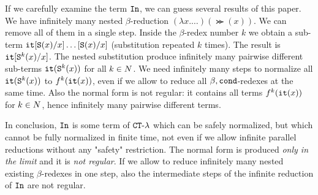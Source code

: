 If we carefully examine the term ${\tt In}$, we can guess several results of this paper.
We have infinitely many nested $\beta$-reduction $(\lambda x. \ldots)(\Succ (x))$.
We can remove all of them in a single step. Inside the $\beta$-redex number $k$ we obtain a sub-term
${\tt it}[{\tt S} (x)/x]\ldots[{\tt S} (x)/x]$ (substitution repeated $k$ times).
The result is ${\tt it}[{\tt S} ^k(x)/x] $.
The nested substitution produce infinitely many pairwise different sub-terms 
${\tt it}({\tt S} ^k(x))$ for all $k \in {N}$.
We need infinitely many steps to normalize all ${\tt it}({\tt S} ^k(x))$ to $f^k({\tt it}(x))$, 
even if we allow to reduce all $\beta,{\tt cond}$-redexes at the same time.
Also the normal form is not regular: it contains all terms $f^k({\tt it}(x))$ for $k \in {N}$, hence
infinitely many pairwise different terms. 

In conclusion, 
${\tt In}$ is some term of ${ {\tt CT}\mbox{-}\lambda}$ which can be safely normalized, but which 
cannot be fully normalized in finite time, not even if we allow
infinite parallel reductions without any "safety" restriction. 
The normal form is produced \emph{only in the limit}
and it is \emph{not regular}. If we allow to reduce infinitely many nested existing
$\beta$-redexes in one step, also
the intermediate steps of the infinite reduction of ${\tt In}$ are not regular.



